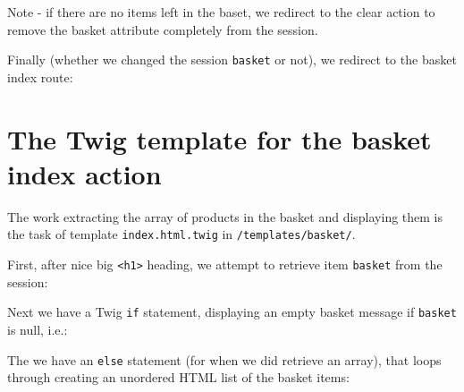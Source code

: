 \documentclass[a4paperpaper,openright]{book}
\newenvironment{Shaded}{}{}
\newcommand{\KeywordTok}[1]{\textcolor[rgb]{0.00,0.44,0.13}{\textbf{#1}}}
\newcommand{\NormalTok}[1]{#1}
\newcommand{\OtherTok}[1]{\textcolor[rgb]{0.00,0.44,0.13}{#1}}
\newcommand{\StringTok}[1]{\textcolor[rgb]{0.25,0.44,0.63}{#1}}
\begin{document}
Note - if there are no items left in the baset, we redirect to the clear
action to remove the basket attribute completely from the session.

Finally (whether we changed the session \texttt{basket} or not), we
redirect to the basket index route:

\begin{Shaded}
\end{Shaded}

\hypertarget{the-twig-template-for-the-basket-index-action}{%
\section{The Twig template for the basket index
action}\label{the-twig-template-for-the-basket-index-action}}

The work extracting the array of products in the basket and displaying
them is the task of template \texttt{index.html.twig} in
\texttt{/templates/basket/}.

First, after nice big \texttt{\textless{}h1\textgreater{}} heading, we
attempt to retrieve item \texttt{basket} from the session:

\begin{Shaded}
\end{Shaded}

Next we have a Twig \texttt{if} statement, displaying an empty basket
message if \texttt{basket} is null, i.e.:

\begin{Shaded}
\end{Shaded}

The we have an \texttt{else} statement (for when we did retrieve an
array), that loops through creating an unordered HTML list of the basket
items:
\end{document}
